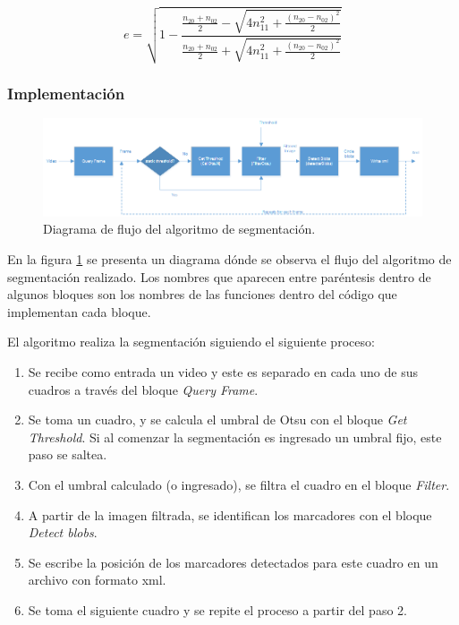 \begin{equation}
e = \sqrt{1-\frac{\frac{n_{20}+n_{02}}{2}-\sqrt{4n_{11}^2+\frac{(n_{20}-n_{02})^2}{2}}}{\frac{n_{20}+n_{02}}{2}+\sqrt{4n_{11}^2+\frac{(n_{20}-n_{02})^2}{2}}}}
\label{excentec}
\end{equation}

\subsubsection{Implementación}
\label{implementSegment}

\begin{figure}[H]
\begin{center}
\includegraphics[scale=0.7]{img/diagrama_segmentacion.png}
\end{center}
\caption{Diagrama de flujo del algoritmo de segmentación.}
\label{diagramaSegmentacion}
\end{figure}

En la figura \ref{diagramaSegmentacion} se presenta un diagrama dónde se observa el flujo del algoritmo de segmentación realizado. Los nombres que aparecen entre paréntesis dentro de algunos bloques son los nombres de las funciones dentro del código que implementan cada bloque. 

El algoritmo realiza la segmentación siguiendo el siguiente proceso:

\begin{enumerate}
  \item Se recibe como entrada un video y este es separado en cada uno de sus cuadros a través del bloque \emph{Query Frame}.
  \item Se toma un cuadro, y se calcula el umbral de Otsu con el bloque \emph{Get Threshold}. Si al comenzar la segmentación es ingresado un umbral fijo, este paso se saltea.
  \item Con el umbral calculado (o ingresado), se filtra el cuadro en el bloque \emph{Filter}.
  \item A partir de la imagen filtrada, se identifican los marcadores con el bloque \emph{Detect blobs}.
  \item Se escribe la posición de los marcadores detectados para este cuadro en un archivo con formato xml.
  \item Se toma el siguiente cuadro y se repite el proceso a partir del paso 2.
\end{enumerate}


